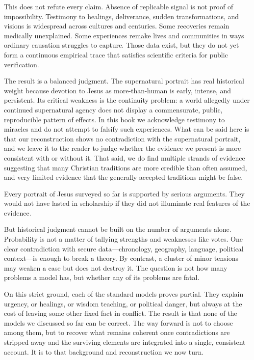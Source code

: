 This does not refute every claim.
Absence of replicable signal is not proof of impossibility.
Testimony to healings, deliverance, sudden transformations, and visions is widespread across cultures and centuries.
Some recoveries remain medically unexplained.
Some experiences remake lives and communities in ways ordinary causation struggles to capture.
Those data exist, but they do not yet form a continuous empirical trace that satisfies scientific criteria for public verification.

The result is a balanced judgment.
The supernatural portrait has real historical weight because devotion to Jesus as more-than-human is early, intense, and persistent.
Its critical weakness is the continuity problem: a world allegedly under continued supernatural agency does not display a commensurate, public, reproducible pattern of effects.
In this book we acknowledge testimony to miracles and do not attempt to falsify such experiences.
What can be said here is that our reconstruction shows no contradiction with the supernatural portrait, and we leave it to the reader to judge whether the evidence we present is more consistent with or without it.
That said, we do find multiple strands of evidence suggesting that many Christian traditions are more credible than often assumed, and very limited evidence that the generally accepted traditions might be false.

\medskip

Every portrait of Jesus surveyed so far is supported by serious arguments.
They would not have lasted in scholarship if they did not illuminate real features of the evidence.

But historical judgment cannot be built on the number of arguments alone.
Probability is not a matter of tallying strengths and weaknesses like votes.
One clear contradiction with secure data—chronology, geography, language, political context—is enough to break a theory.
By contrast, a cluster of minor tensions may weaken a case but does not destroy it.
The question is not how many problems a model has, but whether any of its problems are fatal.

On this strict ground, each of the standard models proves partial.
They explain urgency, or healings, or wisdom teaching, or political danger, but always at the cost of leaving some other fixed fact in conflict.
The result is that none of the models we discussed so far can be correct.
The way forward is not to choose among them, but to recover what remains coherent once contradictions are stripped away and the surviving elements are integrated into a single, consistent account.
It is to that background and reconstruction we now turn.
